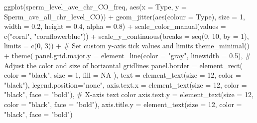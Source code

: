 \documentclass[
  letterpaper,
  DIV=11,
  numbers=noendperiod]{scrreprt}
\newenvironment{Shaded}{\begin{snugshade}}{\end{snugshade}}
\newcommand{\AttributeTok}[1]{\textcolor[rgb]{0.40,0.45,0.13}{#1}}
\newcommand{\CommentTok}[1]{\textcolor[rgb]{0.37,0.37,0.37}{#1}}
\newcommand{\ConstantTok}[1]{\textcolor[rgb]{0.56,0.35,0.01}{#1}}
\newcommand{\DecValTok}[1]{\textcolor[rgb]{0.68,0.00,0.00}{#1}}
\newcommand{\FloatTok}[1]{\textcolor[rgb]{0.68,0.00,0.00}{#1}}
\newcommand{\FunctionTok}[1]{\textcolor[rgb]{0.28,0.35,0.67}{#1}}
\newcommand{\NormalTok}[1]{\textcolor[rgb]{0.00,0.23,0.31}{#1}}
\newcommand{\SpecialCharTok}[1]{\textcolor[rgb]{0.37,0.37,0.37}{#1}}
\newcommand{\StringTok}[1]{\textcolor[rgb]{0.13,0.47,0.30}{#1}}
\begin{document}
\begin{codelisting}
\begin{Shaded}
\begin{Highlighting}[]
\FunctionTok{ggplot}\NormalTok{(sperm\_level\_ave\_chr\_CO\_freq, }\FunctionTok{aes}\NormalTok{(}\AttributeTok{x =}\NormalTok{ Type, }\AttributeTok{y =}\NormalTok{ Sperm\_ave\_all\_chr\_level\_CO)) }\SpecialCharTok{+} 
  \FunctionTok{geom\_jitter}\NormalTok{(}\FunctionTok{aes}\NormalTok{(}\AttributeTok{colour =}\NormalTok{ Type), }\AttributeTok{size =} \DecValTok{1}\NormalTok{, }\AttributeTok{width =} \FloatTok{0.2}\NormalTok{, }\AttributeTok{height =} \FloatTok{0.4}\NormalTok{, }\AttributeTok{alpha =} \FloatTok{0.8}\NormalTok{) }\SpecialCharTok{+} 
  \FunctionTok{scale\_color\_manual}\NormalTok{(}\AttributeTok{values =} \FunctionTok{c}\NormalTok{(}\StringTok{"coral"}\NormalTok{, }\StringTok{"cornflowerblue"}\NormalTok{)) }\SpecialCharTok{+}
  \FunctionTok{scale\_y\_continuous}\NormalTok{(}\AttributeTok{breaks =} \FunctionTok{seq}\NormalTok{(}\DecValTok{0}\NormalTok{, }\DecValTok{10}\NormalTok{, }\AttributeTok{by =} \DecValTok{1}\NormalTok{), }\AttributeTok{limits =} \FunctionTok{c}\NormalTok{(}\DecValTok{0}\NormalTok{, }\DecValTok{3}\NormalTok{)) }\SpecialCharTok{+}  \CommentTok{\# Set custom y{-}axis tick values and limits}
  \FunctionTok{theme\_minimal}\NormalTok{() }\SpecialCharTok{+}
  \FunctionTok{theme}\NormalTok{(}
    \AttributeTok{panel.grid.major.y =} \FunctionTok{element\_line}\NormalTok{(}\AttributeTok{color =} \StringTok{"gray"}\NormalTok{, }\AttributeTok{linewidth =} \FloatTok{0.5}\NormalTok{),  }\CommentTok{\# Adjust the color and size of horizontal gridlines}
    \AttributeTok{panel.border =} \FunctionTok{element\_rect}\NormalTok{(}
      \AttributeTok{color =} \StringTok{"black"}\NormalTok{,}
      \AttributeTok{size =} \DecValTok{1}\NormalTok{,}
      \AttributeTok{fill =} \ConstantTok{NA}
\NormalTok{    ),}
    \AttributeTok{text =} \FunctionTok{element\_text}\NormalTok{(}\AttributeTok{size =} \DecValTok{12}\NormalTok{, }\AttributeTok{color =} \StringTok{"black"}\NormalTok{),}
    \AttributeTok{legend.position=}\StringTok{"none"}\NormalTok{,}
    \AttributeTok{axis.text.x =} \FunctionTok{element\_text}\NormalTok{(}\AttributeTok{size =} \DecValTok{12}\NormalTok{, }\AttributeTok{color =} \StringTok{"black"}\NormalTok{, }\AttributeTok{face =} \StringTok{"bold"}\NormalTok{),  }\CommentTok{\# X{-}axis text color}
    \AttributeTok{axis.text.y =} \FunctionTok{element\_text}\NormalTok{(}\AttributeTok{size =} \DecValTok{12}\NormalTok{, }\AttributeTok{color =} \StringTok{"black"}\NormalTok{, }\AttributeTok{face =} \StringTok{"bold"}\NormalTok{),}
    \AttributeTok{axis.title.y =} \FunctionTok{element\_text}\NormalTok{(}\AttributeTok{size =} \DecValTok{12}\NormalTok{, }\AttributeTok{color =} \StringTok{"black"}\NormalTok{, }\AttributeTok{face =} \StringTok{"bold"}\NormalTok{)}

\end{Highlighting}
\end{Shaded}
\end{codelisting}
\end{document}
